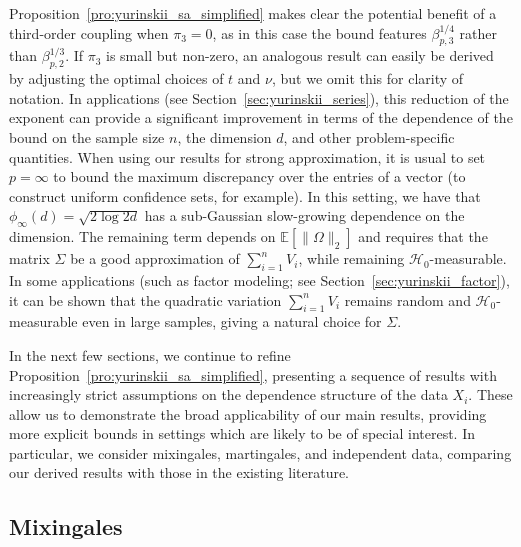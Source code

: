 \documentclass[11pt,lof]{puthesis}
\newcommand{\E}{\ensuremath{\mathbb{E}}}
\newcommand{\cH}{\ensuremath{\mathcal{H}}}
\theoremstyle{break}
\theoremstyle{proof}
\begin{document}
Proposition~\ref{pro:yurinskii_sa_simplified} makes clear the potential benefit
of a
third-order coupling when $\pi_3 = 0$, as in this case the bound features
$\beta_{p,3}^{1/4}$ rather than $\beta_{p,2}^{1/3}$. If $\pi_3$ is small but
non-zero, an analogous result can easily be derived by adjusting the optimal
choices of $t$ and $\nu$, but we omit this for clarity of notation. In
applications (see Section~\ref{sec:yurinskii_series}), this reduction of the
exponent can
provide a significant improvement in terms of the dependence of the bound on
the sample size $n$, the dimension $d$, and other problem-specific quantities.
When using our results for strong approximation, it is usual to set
$p = \infty$ to bound the maximum discrepancy over the entries of a vector (to
construct uniform confidence sets, for example). In this setting, we have that
$\phi_\infty(d) = \sqrt{2 \log 2d}$ has a sub-Gaussian slow-growing dependence
on the dimension. The remaining term depends on $\E[\|\Omega\|_2]$ and requires
that the matrix $\Sigma$ be a good approximation of $\sum_{i=1}^{n} V_i$, while
remaining $\cH_0$-measurable. In some applications (such as factor modeling;
see Section~\ref{sec:yurinskii_factor}), it can be shown that the quadratic
variation $\sum_{i=1}^n V_i$ remains random and $\cH_0$-measurable even in large
samples, giving a natural choice for $\Sigma$.

In the next few sections, we continue to refine
Proposition~\ref{pro:yurinskii_sa_simplified}, presenting a sequence of results
with increasingly strict assumptions on the dependence structure of the data
$X_i$.
These allow us to demonstrate the broad applicability of our main results,
providing more explicit bounds in settings which are likely to be of special
interest. In particular, we consider mixingales, martingales, and independent
data, comparing our derived results with those in the existing literature.

\subsection{Mixingales}
\label{sec:yurinskii_mixingales}
\end{document}
